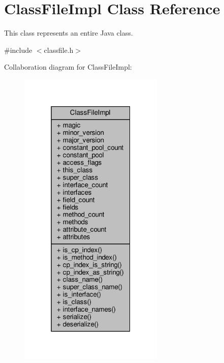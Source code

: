 \hypertarget{classClassFileImpl}{}\section{Class\+File\+Impl Class Reference}
\label{classClassFileImpl}


This class represents an entire Java class.  




{\ttfamily \#include $<$classfile.\+h$>$}



Collaboration diagram for Class\+File\+Impl\+:\nopagebreak
\begin{figure}[H]
\begin{center}
\leavevmode
\includegraphics[width=196pt]{classClassFileImpl__coll__graph}
\end{center}
\end{figure}
